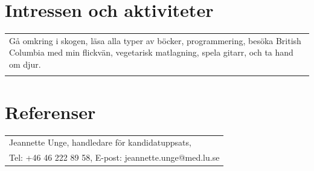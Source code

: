 \documentclass[11pt,a4paper]{article}
\begin{document}
\section{Intressen och aktiviteter}
\begin{tabularx}{\textwidth}{X}
Gå omkring i skogen, läsa alla typer av böcker, programmering, besöka British Columbia med min flickvän, vegetarisk matlagning, spela gitarr, och ta hand om djur.\\
\\
\end{tabularx}


\section{Referenser}
\begin{tabularx}{\textwidth}{X}
Jeannette Unge, handledare för kandidatuppsats,\\ Tel: +46 46 222 89 58, E-post: jeannette.unge@med.lu.se
\\
\end{tabularx}
\end{document}
